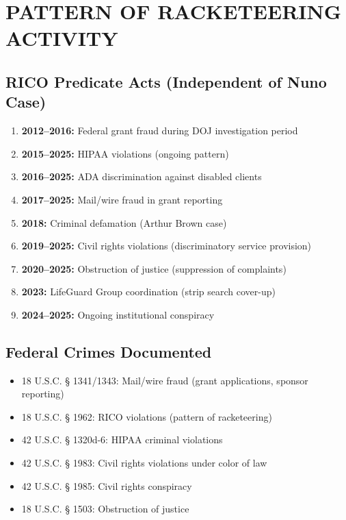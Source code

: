 \documentclass[12pt,oneside]{article}
\begin{document}
\section*{PATTERN OF RACKETEERING ACTIVITY}

\subsection*{RICO Predicate Acts (Independent of Nuno Case)}

\begin{enumerate}
\item \textbf{2012--2016:} Federal grant fraud during DOJ investigation period
\item \textbf{2015--2025:} HIPAA violations (ongoing pattern)
\item \textbf{2016--2025:} ADA discrimination against disabled clients
\item \textbf{2017--2025:} Mail/wire fraud in grant reporting
\item \textbf{2018:} Criminal defamation (Arthur Brown case)
\item \textbf{2019--2025:} Civil rights violations (discriminatory service provision)
\item \textbf{2020--2025:} Obstruction of justice (suppression of complaints)
\item \textbf{2023:} LifeGuard Group coordination (strip search cover-up)
\item \textbf{2024--2025:} Ongoing institutional conspiracy
\end{enumerate}

\subsection*{Federal Crimes Documented}

\begin{itemize}
\item 18 U.S.C. § 1341/1343: Mail/wire fraud (grant applications, sponsor reporting)
\item 18 U.S.C. § 1962: RICO violations (pattern of racketeering)
\item 42 U.S.C. § 1320d-6: HIPAA criminal violations
\item 42 U.S.C. § 1983: Civil rights violations under color of law
\item 42 U.S.C. § 1985: Civil rights conspiracy
\item 18 U.S.C. § 1503: Obstruction of justice
\end{itemize}
\end{document}
